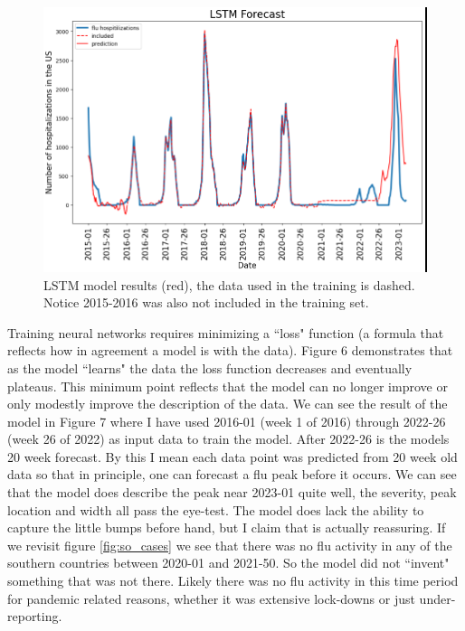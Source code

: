 \documentclass[12pt,a4paper,english]{article}
\begin{document}
	\begin{figure}[h!]
		\begin{center}
		\includegraphics[scale=0.6]{Pictures/lstm_model.png}
		\caption{LSTM model results (red), the data used in the training is dashed. Notice 2015-2016 was also not included in the training set.}
		\end{center}
		\label{fig:lstm_model}
	\end{figure}
\FloatBarrier

Training neural networks requires minimizing a ``loss" function (a formula that reflects how in agreement a model is with the data). Figure 6 demonstrates that as the model ``learns" the data the loss function decreases and eventually plateaus. This minimum point reflects that the model can no longer improve or only modestly improve the description of the data. We can see the result of the model in Figure 7 where I have used 2016-01 (week 1 of 2016) through 2022-26 (week 26 of 2022) as input data to train the model. After 2022-26 is the models 20 week forecast. By this I mean each data point was predicted from 20 week old data so that in principle, one can forecast a flu peak before it occurs. We can see that the model does describe the peak near 2023-01 quite well, the severity, peak location and width all pass the eye-test. The model does lack the ability to capture the little bumps before hand, but I claim that is actually reassuring. If we revisit figure \ref{fig:so_cases} we see that there was no flu activity in any of the southern countries between 2020-01 and 2021-50. So the model did not ``invent" something that was not there. Likely there was no flu activity in this time period for pandemic related reasons, whether it was extensive lock-downs or just under-reporting.
\end{document}
